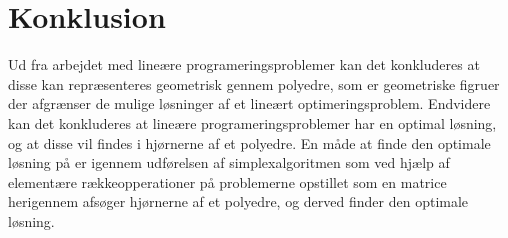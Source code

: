 \chapter{Konklusion}
Ud fra arbejdet med lineære programeringsproblemer kan det konkluderes at disse kan repræsenteres geometrisk gennem polyedre, som er geometriske figruer der afgrænser de mulige løsninger af et lineært optimeringsproblem.
Endvidere kan det konkluderes at lineære programeringsproblemer har en optimal løsning, og at disse vil findes i hjørnerne af et polyedre.
En måde at finde den optimale løsning på er igennem udførelsen af simplexalgoritmen som ved hjælp af elementære rækkeopperationer på problemerne opstillet som en matrice herigennem afsøger hjørnerne af et polyedre, og derved finder den optimale løsning.